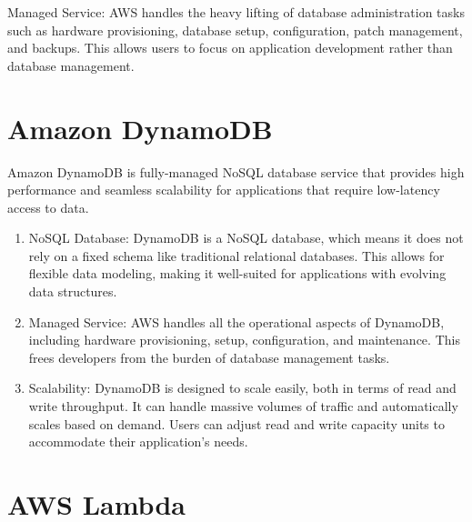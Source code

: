\documentclass[11pt,a4paper,oneside]{report}
\begin{document}
Managed Service: AWS handles the heavy lifting of database administration tasks such as hardware provisioning, database setup, configuration, patch management, and backups. This allows users to focus on application development rather than database management.


\section{Amazon DynamoDB}

Amazon DynamoDB \cite{awsddb} is fully-managed NoSQL database service that provides high performance and seamless scalability for applications that require low-latency access to data.
\begin{enumerate}
  \item NoSQL Database: DynamoDB is a NoSQL database, which means it does not rely on a fixed schema like traditional relational databases. This allows for flexible data modeling, making it well-suited for applications with evolving data structures.
  \item Managed Service: AWS handles all the operational aspects of DynamoDB, including hardware provisioning, setup, configuration, and maintenance. This frees developers from the burden of database management tasks.
  \item Scalability: DynamoDB is designed to scale easily, both in terms of read and write throughput. It can handle massive volumes of traffic and automatically scales based on demand. Users can adjust read and write capacity units to accommodate their application's needs.
\end{enumerate}

\section{AWS Lambda}
\end{document}
